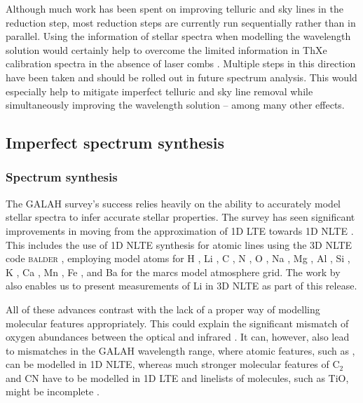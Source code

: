 \documentclass[
  journal=pasa,
  manuscript=research-paper, %
  year=2024,
  volume=37
]{cup-journal}
\newcommand\ion[2]{\text{#1\,\textsc{\lowercase{#2}}}}	%
\begin{document}
Although much work has been spent on improving telluric and sky lines in the reduction step, most reduction steps are currently run sequentially rather than in parallel. Using the information of stellar spectra when modelling the wavelength solution would certainly help to overcome the limited information in ThXe calibration spectra in the absence of laser combs \citep{Kos2018b}. Multiple steps in this direction have been taken \citep{Saydjari2023} and should be rolled out in future spectrum analysis. This would especially help to mitigate imperfect telluric and sky line removal while simultaneously improving the wavelength solution -- among many other effects.

\subsection{Imperfect spectrum synthesis} \label{sec:caveats_synthesis}

\subsubsection{Spectrum synthesis}

The GALAH survey's success relies heavily on the ability to accurately model stellar spectra to infer accurate stellar properties. The survey has seen significant improvements in moving from the approximation of 1D LTE towards 1D NLTE \citep{Amarsi2020}. This includes the use of 1D NLTE synthesis for atomic lines using the 3D NLTE code \textsc{balder} \citep{Amarsi2018}, employing model atoms for H  \citep{Amarsi2018}, Li \citep{Lind2009, Wang2021}, C \citep{Amarsi2019}, N \citep{Amarsi2020b}, O \citep{Amarsi2018b}, Na \citep{Lind2011}, Mg \citep{Osorio2015}, Al \citep{Nordlander2017}, Si \citep{Amarsi2017}, K \citep{Reggiani2019}, Ca \citep{Osorio2019}, Mn \citep{Bergemann2019b}, Fe \citep{Amarsi2018, Amarsi2022}, and Ba \citep{Gallagher2020} for the {\sc marcs} model atmosphere grid. The work by \citet{Wang2024} also enables us to present measurements of Li in 3D NLTE as part of this release.

All of these advances contrast with the lack of a proper way of modelling molecular features appropriately. This could explain the significant mismatch of oxygen abundances between the optical and infrared \citep[compare e.g.][]{Bensby2014, SDSSDR17}. It can, however, also lead to mismatches in the GALAH wavelength range, where atomic features, such as \ion{C}{I}, can be modelled in 1D NLTE, whereas much stronger molecular features of $\mathrm{C}_2$ and CN have to be modelled in 1D LTE and linelists of molecules, such as TiO, might be incomplete \citep{Hoeijmakers2015, McKemmish2019}.
\end{document}
